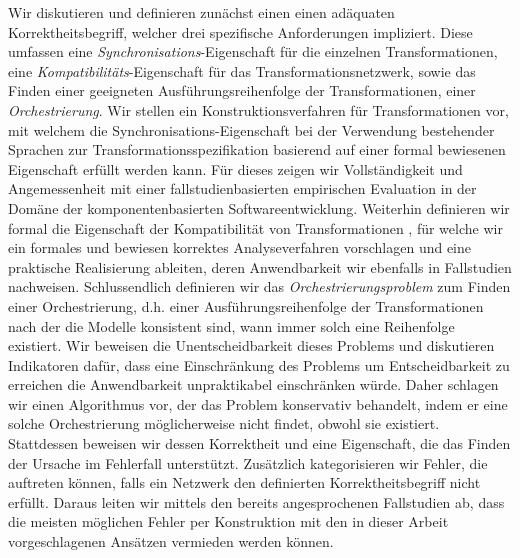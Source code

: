 Wir diskutieren und definieren zunächst einen einen adäquaten Korrektheitsbegriff, welcher drei spezifische Anforderungen impliziert. Diese umfassen eine \emph{Synchronisations}-Eigenschaft für die einzelnen Transformationen, eine \emph{Kompatibilitäts}-Eigenschaft für das Transformationsnetzwerk, sowie das Finden einer geeigneten Ausführungsreihenfolge der Transformationen, einer \emph{Orchestrierung}.
Wir stellen ein Konstruktionsverfahren für Transformationen vor, mit welchem die Synchronisations-Eigenschaft bei der Verwendung bestehender Sprachen zur Transformationsspezifikation basierend auf einer formal bewiesenen Eigenschaft erfüllt werden kann.
Für dieses zeigen wir Vollständigkeit und Angemessenheit mit einer fallstudienbasierten empirischen Evaluation in der Domäne der komponentenbasierten Softwareentwicklung.
Weiterhin definieren wir formal die Eigenschaft der Kompatibilität von Transformationen%
, für welche wir ein formales und bewiesen korrektes Analyseverfahren vorschlagen und eine praktische Realisierung ableiten, deren Anwendbarkeit wir ebenfalls in Fallstudien nachweisen.
Schlussendlich definieren wir das \emph{Orchestrierungsproblem} zum Finden einer Orchestrierung, d.h. einer Ausführungsreihenfolge der Transformationen nach der die Modelle konsistent sind, wann immer solch eine Reihenfolge existiert. %
Wir beweisen die Unentscheidbarkeit dieses Problems und diskutieren Indikatoren dafür, dass eine Einschränkung des Problems um Entscheidbarkeit zu erreichen die Anwendbarkeit unpraktikabel einschränken würde.
Daher schlagen wir einen Algorithmus vor, der das Problem konservativ behandelt, indem er eine solche Orchestrierung möglicherweise nicht findet, obwohl sie existiert.
Stattdessen beweisen wir dessen Korrektheit und eine Eigenschaft, die das Finden der Ursache im Fehlerfall unterstützt.
Zusätzlich kategorisieren wir Fehler, die auftreten können, falls ein Netzwerk den definierten Korrektheitsbegriff nicht erfüllt.
Daraus leiten wir mittels den bereits angesprochenen Fallstudien ab, dass die meisten möglichen Fehler per Konstruktion mit den in dieser Arbeit vorgeschlagenen Ansätzen vermieden werden können.

